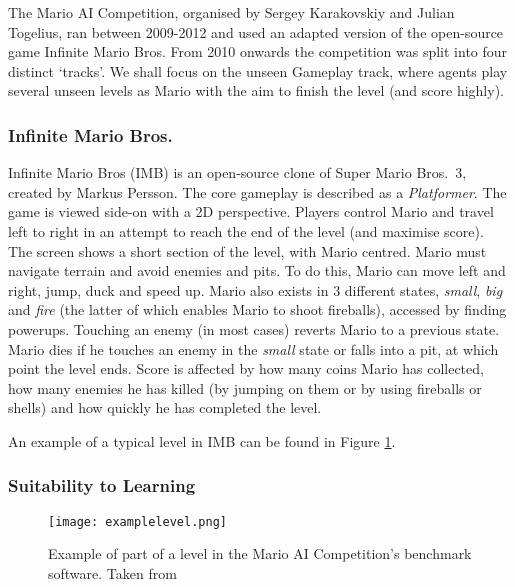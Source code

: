 The Mario AI Competition, organised by Sergey Karakovskiy and Julian Togelius, ran between 2009-2012 and used an adapted version of the open-source game Infinite Mario Bros. From 2010 onwards the competition was split into four distinct `tracks'. We shall focus on the unseen Gameplay track, where agents play several unseen levels as Mario with the aim to finish the level (and score highly). \cite{marioaicomp} \cite{2012the}

\subsubsection*{\hspace{6pt}Infinite Mario Bros.}

Infinite Mario Bros (IMB) \cite{imb} is an open-source clone of Super Mario Bros.~3, created by Markus Persson. The core gameplay is described as a \emph{Platformer}. The game is viewed side-on with a 2D perspective. Players control Mario and travel left to right in an attempt to reach the end of the level (and maximise score). The screen shows a short section of the level, with Mario centred. Mario must navigate terrain and avoid enemies and pits. To do this, Mario can move left and right, jump, duck and speed up. Mario also exists in 3 different states, \emph{small}, \emph{big} and \emph{fire} (the latter of which enables Mario to shoot fireballs), accessed by finding powerups. Touching an enemy (in most cases) reverts Mario to a previous state. Mario dies if he touches an enemy in the \emph{small} state or falls into a pit, at which point the level ends. Score is affected by how many coins Mario has collected, how many enemies he has killed (by jumping on them or by using fireballs or shells) and how quickly he has completed the level. \cite[p.~3]{2012the}

An example of a typical level in IMB can be found in Figure \ref{fig:xmpllevel}.

\subsubsection*{\hspace{6pt}Suitability to Learning}

\begin{figure}[t]
	\begin{adjustwidth}{-0cm}{-0cm}
    \centering
    \texttt{[image: examplelevel.png]}
    \caption{Example of part of a level in the Mario AI Competition's benchmark software. Taken from \cite[p.~6]{2012the}}
    \label{fig:xmpllevel}
    \end{adjustwidth}
\end{figure}

